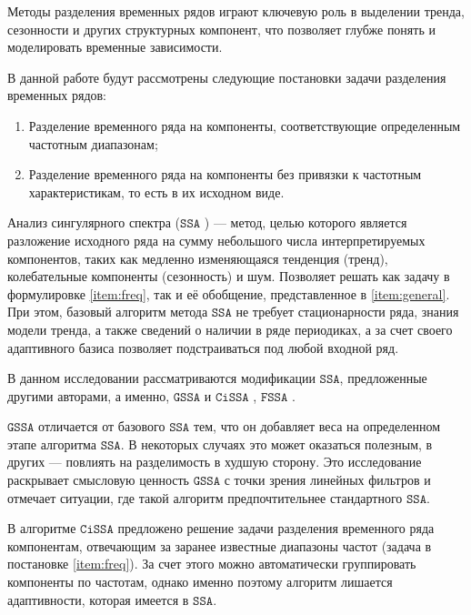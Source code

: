 \documentclass[12pt, specialist, subf
]{disser}
\theoremstyle{definition}
\newcommand{\SSA}{\texttt{SSA}}
\newcommand{\GSSA}{\texttt{GSSA}}
\newcommand{\CISSA}{\texttt{CiSSA}}
\newcommand{\FSSA}{\texttt{FSSA}}
\newcommand{\TS}{\mathsf{X}}
\newtheorem{comment}{Замечание} %
\begin{document}

Методы разделения временных рядов играют ключевую роль в выделении тренда, сезонности и других структурных компонент, что позволяет глубже понять и моделировать временные зависимости.


В данной работе будут рассмотрены следующие постановки задачи разделения временных рядов:
\begin{enumerate}
	\item \label{item:freq} Разделение временного ряда на компоненты, соответствующие определенным частотным диапазонам;
	\item \label{item:general} Разделение временного ряда на компоненты без привязки к частотным характеристикам, то есть в их исходном виде.
\end{enumerate}


Анализ сингулярного спектра ($\SSA$ \cite{golyandina2001analysis}) --- метод, целью которого является разложение исходного ряда на сумму небольшого числа интерпретируемых компонентов, таких как медленно изменяющаяся тенденция (тренд), колебательные компоненты (сезонность) и шум. Позволяет решать как задачу в формулировке \ref{item:freq}, так и её обобщение, представленное в \ref{item:general}. При этом, базовый алгоритм метода $\SSA$ не требует стационарности ряда, знания модели тренда, а также сведений о наличии в ряде периодиках, а за счет своего адаптивного базиса позволяет подстраиваться под любой входной ряд.

В данном исследовании рассматриваются модификации $\SSA$, предложенные другими авторами, а именно, $\GSSA$ \cite{gu2024generalized} и $\CISSA$ \cite{bogalo2020}, $\FSSA$ \cite{haghbin2019functionalsingularspectrumanalysis}.


$\GSSA$ отличается от базового $\SSA$ тем, что он добавляет веса на определенном этапе алгоритма $\SSA$. В некоторых случаях это может оказаться полезным, в других --- повлиять на разделимость в худшую сторону.
Это исследование раскрывает смысловую ценность $\GSSA$ с точки зрения линейных фильтров и отмечает ситуации, где такой алгоритм предпочтительнее стандартного $\SSA$.


В алгоритме $\CISSA$ предложено решение задачи разделения временного ряда компонентам, отвечающим за заранее известные диапазоны частот  (задача в постановке \ref{item:freq}). За счет этого можно автоматически группировать компоненты по частотам, однако именно поэтому алгоритм лишается адаптивности, которая имеется в $\SSA$.
\end{document}
